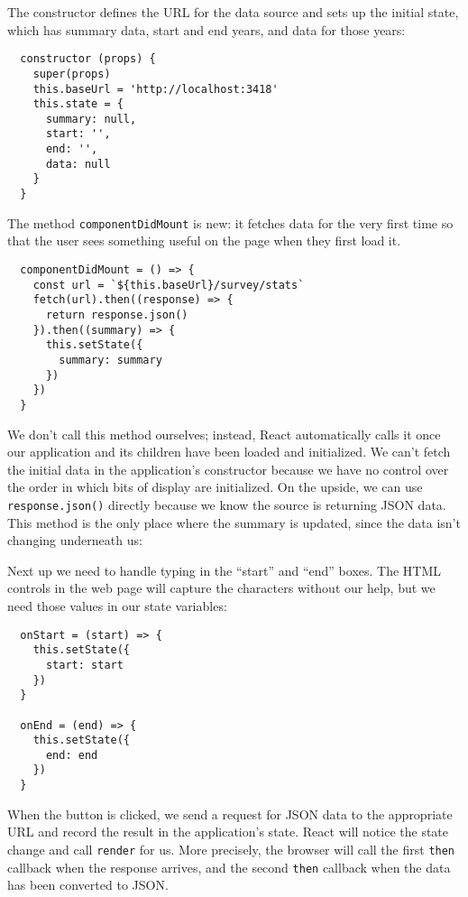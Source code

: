 The constructor defines the URL for the data source and sets up the initial state,
which has summary data,
start and end years,
and data for those years:

\begin{verbatim}
  constructor (props) {
    super(props)
    this.baseUrl = 'http://localhost:3418'
    this.state = {
      summary: null,
      start: '',
      end: '',
      data: null
    }
  }
\end{verbatim}

The method \texttt{componentDidMount} is new:
it fetches data for the very first time
so that the user sees something useful on the page when they first load it.

\begin{verbatim}
  componentDidMount = () => {
    const url = `${this.baseUrl}/survey/stats`
    fetch(url).then((response) => {
      return response.json()
    }).then((summary) => {
      this.setState({
        summary: summary
      })
    })
  }
\end{verbatim}

We don't call this method ourselves;
instead,
React automatically calls it once our application and its children have been loaded and initialized.
We can't fetch the initial data in the application's constructor because
we have no control over the order in which bits of display are initialized.
On the upside,
we can use \texttt{response.json()} directly because we know the source is returning JSON data.
This method is the only place where the summary is updated,
since the data isn't changing underneath us:

Next up we need to handle typing in the ``start'' and ``end'' boxes.
The HTML controls in the web page will capture the characters without our help,
but we need those values in our state variables:

\begin{verbatim}
  onStart = (start) => {
    this.setState({
      start: start
    })
  }

  onEnd = (end) => {
    this.setState({
      end: end
    })
  }
\end{verbatim}

When the button is clicked,
we send a request for JSON data to the appropriate URL
and record the result in the application's state.
React will notice the state change and call \texttt{render} for us.
More precisely,
the browser will call the first \texttt{then} callback when the response arrives,
and the second \texttt{then} callback when the data has been converted to JSON.

